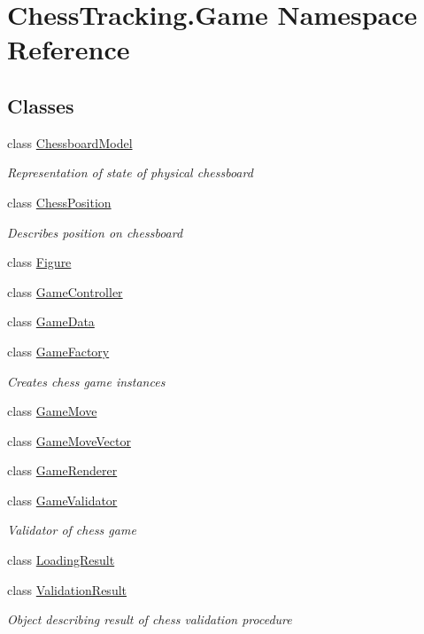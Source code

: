 \hypertarget{namespace_chess_tracking_1_1_game}{}\section{Chess\+Tracking.\+Game Namespace Reference}
\label{namespace_chess_tracking_1_1_game}
\subsection*{Classes}
\begin{DoxyCompactItemize}
\item 
class \mbox{\hyperlink{class_chess_tracking_1_1_game_1_1_chessboard_model}{Chessboard\+Model}}
\begin{DoxyCompactList}\small\item\em Representation of state of physical chessboard \end{DoxyCompactList}\item 
class \mbox{\hyperlink{class_chess_tracking_1_1_game_1_1_chess_position}{Chess\+Position}}
\begin{DoxyCompactList}\small\item\em Describes position on chessboard \end{DoxyCompactList}\item 
class \mbox{\hyperlink{class_chess_tracking_1_1_game_1_1_figure}{Figure}}
\item 
class \mbox{\hyperlink{class_chess_tracking_1_1_game_1_1_game_controller}{Game\+Controller}}
\item 
class \mbox{\hyperlink{class_chess_tracking_1_1_game_1_1_game_data}{Game\+Data}}
\item 
class \mbox{\hyperlink{class_chess_tracking_1_1_game_1_1_game_factory}{Game\+Factory}}
\begin{DoxyCompactList}\small\item\em Creates chess game instances \end{DoxyCompactList}\item 
class \mbox{\hyperlink{class_chess_tracking_1_1_game_1_1_game_move}{Game\+Move}}
\item 
class \mbox{\hyperlink{class_chess_tracking_1_1_game_1_1_game_move_vector}{Game\+Move\+Vector}}
\item 
class \mbox{\hyperlink{class_chess_tracking_1_1_game_1_1_game_renderer}{Game\+Renderer}}
\item 
class \mbox{\hyperlink{class_chess_tracking_1_1_game_1_1_game_validator}{Game\+Validator}}
\begin{DoxyCompactList}\small\item\em Validator of chess game \end{DoxyCompactList}\item 
class \mbox{\hyperlink{class_chess_tracking_1_1_game_1_1_loading_result}{Loading\+Result}}
\item 
class \mbox{\hyperlink{class_chess_tracking_1_1_game_1_1_validation_result}{Validation\+Result}}
\begin{DoxyCompactList}\small\item\em Object describing result of chess validation procedure \end{DoxyCompactList}\end{DoxyCompactItemize}
